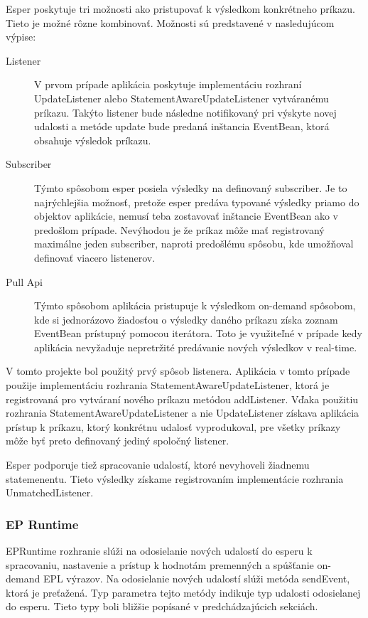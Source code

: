 		Esper poskytuje tri možnosti ako pristupovať k výsledkom konkrétneho príkazu. Tieto je možné rôzne kombinovať. Možnosti sú predstavené v nasledujúcom výpise:
		\begin{description}
			\item[Listener] V prvom prípade aplikácia poskytuje implementáciu rozhraní UpdateListener alebo StatementAwareUpdateListener vytváranému príkazu. Takýto listener bude následne notifikovaný pri výskyte novej udalosti a metóde update bude predaná inštancia EventBean, ktorá obsahuje výsledok príkazu.
			\item[Subscriber] Týmto spôsobom esper posiela výsledky na definovaný subscriber. Je to najrýchlejšia možnosť, pretože esper predáva typované výsledky priamo do objektov aplikácie, nemusí teba zostavovať inštancie EventBean ako v predošlom prípade. Nevýhodou je že príkaz môže mať registrovaný maximálne jeden subscriber, naproti predošlému spôsobu, kde umožňoval definovať viacero listenerov.
			\item[Pull Api] Týmto spôsobom aplikácia pristupuje k výsledkom on-demand spôsobom, kde si jednorázovo žiadosťou o výsledky daného príkazu získa zoznam EventBean prístupný pomocou iterátora. Toto je využiteľné v prípade kedy aplikácia nevyžaduje nepretržité predávanie nových výsledkov v real-time.
		\end{description}
		V tomto projekte bol použitý prvý spôsob listenera. Aplikácia v tomto prípade použije implementáciu rozhrania StatementAwareUpdateListener, ktorá je registrovaná pro vytváraní nového príkazu metódou addListener. Vďaka použitiu rozhrania StatementAwareUpdateListener a nie UpdateListener získava aplikácia prístup k príkazu, ktorý konkrétnu udalosť vyprodukoval, pre všetky príkazy môže byť preto definovaný jediný spoločný listener.
		
		Esper podporuje tiež spracovanie udalostí, ktoré nevyhoveli žiadnemu statemenentu. Tieto výsledky získame registrovaním implementácie rozhrania UnmatchedListener. 
		
		\subsubsection{EP Runtime}
		EPRuntime rozhranie slúži na odosielanie nových udalostí do esperu k spracovaniu, nastavenie a prístup k hodnotám premenných a spúšťanie on-demand EPL výrazov. Na odosielanie nových udalostí slúži metóda sendEvent, ktorá je preťažená. Typ parametra tejto metódy indikuje typ udalosti odosielanej do esperu. Tieto typy boli bližšie popísané v predchádzajúcich sekciách.
		
